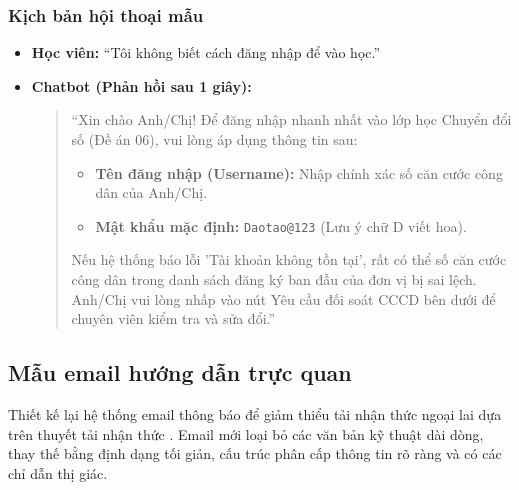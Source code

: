 \subsubsection{Kịch bản hội thoại mẫu}
\begin{itemize}
    \item \textbf{Học viên:} ``Tôi không biết cách đăng nhập để vào học.''
    \item \textbf{Chatbot (Phản hồi sau 1 giây):}
    \begin{quote}
        ``Xin chào Anh/Chị! Để đăng nhập nhanh nhất vào lớp học Chuyển đổi số (Đề án 06), vui lòng áp dụng thông tin sau:
        \begin{itemize}
            \item \textbf{Tên đăng nhập (Username):} Nhập chính xác số căn cước công dân của Anh/Chị.
            \item \textbf{Mật khẩu mặc định:} \texttt{Daotao@123} (Lưu ý chữ D viết hoa).
        \end{itemize}
        Nếu hệ thống báo lỗi 'Tài khoản không tồn tại', rất có thể số căn cước công dân trong danh sách đăng ký ban đầu của đơn vị bị sai lệch. Anh/Chị vui lòng nhấp vào nút Yêu cầu đối soát CCCD bên dưới để chuyên viên kiểm tra và sửa đổi.''
    \end{quote}
\end{itemize}

\subsection{Mẫu email hướng dẫn trực quan}

Thiết kế lại hệ thống email thông báo để giảm thiểu tải nhận thức ngoại lai dựa trên thuyết tải nhận thức \parencite{sweller1988}. Email mới loại bỏ các văn bản kỹ thuật dài dòng, thay thế bằng định dạng tối giản, cấu trúc phân cấp thông tin rõ ràng và có các chỉ dẫn thị giác.

